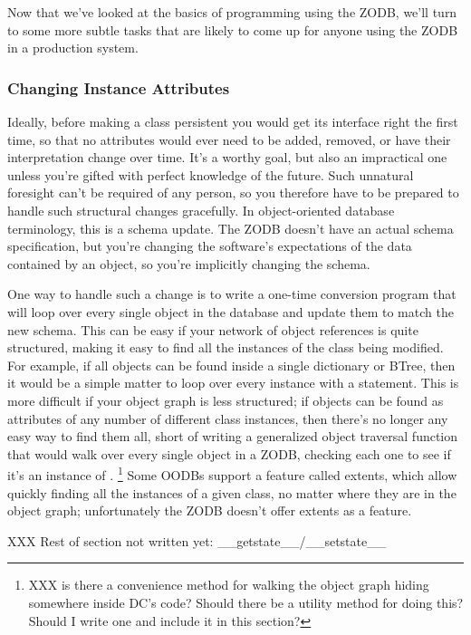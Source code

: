 Now that we've looked at the basics of programming using the ZODB,
we'll turn to some more subtle tasks that are likely to come up for
anyone using the ZODB in a production system.

\subsubsection{Changing Instance Attributes}

Ideally, before making a class persistent you would get its interface
right the first time, so that no attributes would ever need to be
added, removed, or have their interpretation change over time.  It's a
worthy goal, but also an impractical one unless you're gifted with
perfect knowledge of the future.  Such unnatural foresight can't be
required of any person, so you therefore have to be prepared to handle
such structural changes gracefully.  In object-oriented database
terminology, this is a schema update.  The ZODB doesn't have an actual
schema specification, but you're changing the software's expectations
of the data contained by an object, so you're implicitly changing the
schema.

One way to handle such a change is to write a one-time conversion
program that will loop over every single object in the database and
update them to match the new schema.  This can be easy if your network
of object references is quite structured, making it easy to find all
the instances of the class being modified.  For example, if all
 objects can be found inside a single dictionary or
BTree, then it would be a simple matter to loop over every
 instance with a  statement.
This is more difficult if your object graph is less structured; if
 objects can be found as attributes of any number of
different class instances, then there's no longer any easy way to find
them all, short of writing a generalized object traversal function
that would walk over every single object in a ZODB, checking each one
to see if it's an instance of .  
\footnote{XXX is there a convenience method for walking the object graph hiding
somewhere inside DC's code?  Should there be a utility method for
doing this?  Should I write one and include it in this section?}
Some OODBs support a feature called extents, which allow quickly
finding all the instances of a given class, no matter where they are
in the object graph; unfortunately the ZODB doesn't offer extents as a
feature.

XXX Rest of section not written yet: __getstate__/__setstate__

